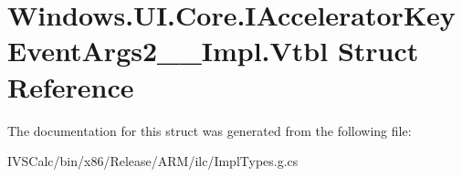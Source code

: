 \hypertarget{struct_windows_1_1_u_i_1_1_core_1_1_i_accelerator_key_event_args2_____impl_1_1_vtbl}{}\section{Windows.\+U\+I.\+Core.\+I\+Accelerator\+Key\+Event\+Args2\+\_\+\+\_\+\+Impl.\+Vtbl Struct Reference}
\label{struct_windows_1_1_u_i_1_1_core_1_1_i_accelerator_key_event_args2_____impl_1_1_vtbl}


The documentation for this struct was generated from the following file\+:\begin{DoxyCompactItemize}
\item 
I\+V\+S\+Calc/bin/x86/\+Release/\+A\+R\+M/ilc/Impl\+Types.\+g.\+cs\end{DoxyCompactItemize}
